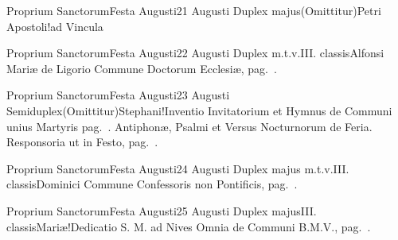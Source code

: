 \documentclass[nocturnale-romanum.tex]{subfiles}
\begin{document}

	{Proprium Sanctorum}{Festa Augusti}{2}{1 Augusti}
	{Duplex majus}{(Omittitur)}{Petri Apostoli!ad Vincula}
	{}
	{}
\tedeumrubric


	{Proprium Sanctorum}{Festa Augusti}{2}{2 Augusti}
	{Duplex m.t.v.}{III. classis}{Alfonsi Mariæ de Ligorio}
	{Commune Doctorum Ecclesiæ, pag.\ \pageref{M-CODO}.}
	{}

	{Proprium Sanctorum}{Festa Augusti}{2}{3 Augusti}
	{Semiduplex}{(Omittitur)}{Stephani!Inventio}
	{Invitatorium et Hymnus de Communi unius Martyris pag.\ \pageref{M-UMEX}. Antiphonæ, Psalmi et Versus Nocturnorum de Feria. Responsoria ut in Festo, pag.\ \pageref{M-1226}.}
	{}

	{Proprium Sanctorum}{Festa Augusti}{2}{4 Augusti}
	{Duplex majus m.t.v.}{III. classis}{Dominici}
	{Commune Confessoris non Pontificis, pag.\ \pageref{M-CONP}.}
	{}

	{Proprium Sanctorum}{Festa Augusti}{2}{5 Augusti}
	{Duplex majus}{III. classis}{Mariæ!Dedicatio S. M. ad Nives}
	{Omnia de Communi B.M.V., pag.\ \pageref{M-CBMV}.}
	{}
\end{document}
